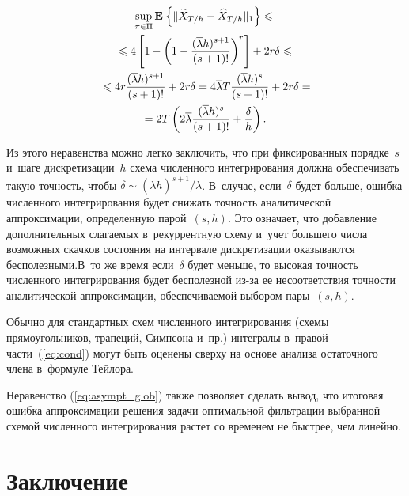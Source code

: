 \begin{multicols}{2}
 \vspace*{-4pt}
 
 \noindent
\begin{multline}
\sup\limits_{\pi \in \Pi}\mathbf{E}_{  }\left\{ \mathop{\|\widetilde{X}_{T/h} - \widehat{X}_{T/h}\|_1} \right\} 
\leqslant {}  \\ 
{}\leqslant  
 4
\left[ 1-\left(1-\displaystyle\frac{\displaystyle (\overline{\lambda}h)^{s+1}\mathstrut}{\displaystyle (s+1)!\mathstrut}\right)^r
\right] + 2r\delta
\leqslant{}\\
{}\leqslant
4r\displaystyle\frac{\displaystyle (\overline{\lambda}h)^{s+1}\mathstrut}{\displaystyle (s+1)!\mathstrut}+2r\delta=
4\overline{\lambda}T \displaystyle\frac{\displaystyle (\overline{\lambda}h)^{s}\mathstrut}{\displaystyle (s+1)!\mathstrut}+2r\delta = \\ =
2T\left(2\overline{\lambda} \displaystyle\frac{\displaystyle (\overline{\lambda}h)^s\mathstrut}{\displaystyle (s+1)!\mathstrut}+
 \displaystyle\frac{\displaystyle \delta\mathstrut}{\displaystyle h\mathstrut}\right).
 \label{eq:asympt_glob}
\end{multline}

\vspace*{-2pt}

\noindent
Из этого неравенства можно легко заключить, что при фиксированных порядке~$s$ и~шаге 
дискретизации~$h$ схема численного интегрирования должна обеспечивать такую точность, 
чтобы $\delta \sim {(\overline{\lambda}h)^{s+1}}/{\overline{\lambda}}$. 
В~случае, если~$\delta$ будет больше, ошибка численного интегрирования 
будет снижать точность аналитической аппроксимации, определенную парой~$(s,h)$. 
Это означает, что добавление дополнительных слагаемых в~рекуррентную схему и~учет 
большего чис\-ла возможных скачков состояния на интервале дискретизации оказываются 
бесполезными.\linebreak В~то же время если~$\delta$ будет меньше, то высокая точность 
чис\-лен\-но\-го интегрирования будет бесполезной из-за ее несоответствия 
точности аналитической аппроксимации, обеспечиваемой выбором пары~$(s,h)$.

Обычно для стандартных схем численного интегрирования (схемы 
прямоугольников, трапеций, Симпсона и~пр.) интегралы в~правой части~(\ref{eq:cond}) 
могут быть оценены сверху на основе анализа остаточного члена в~формуле Тейлора.

Неравенство (\ref{eq:asympt_glob}) также позволяет сделать вывод, что 
итоговая ошибка аппроксимации решения задачи оптимальной фильтрации 
выбранной схемой численного интегрирования растет со временем не быстрее, 
чем линейно.

 \vspace*{-6pt}

 \section{Заключение}
 

\end{multicols}
